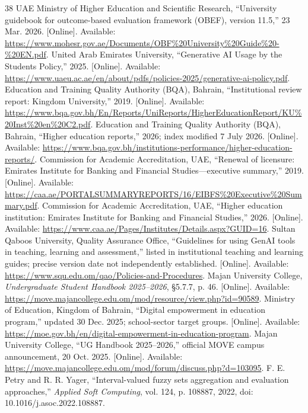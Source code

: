 \documentclass[conference,letterpaper]{IEEEtran}
\begin{document}
\begin{thebibliography}{38}
 UAE Ministry of Higher Education and Scientific Research, ``University guidebook for outcome-based evaluation framework (OBEF), version 11.5,'' 23 Mar. 2026. [Online]. Available: \url{https://www.mohesr.gov.ae/Documents/OBF%20University%20Guide%20-%20EN.pdf}.
 United Arab Emirates University, ``Generative AI Usage by the Students Policy,'' 2025. [Online]. Available: \url{https://www.uaeu.ac.ae/en/about/pdfs/policies-2025/generative-ai-policy.pdf}.
 Education and Training Quality Authority (BQA), Bahrain, ``Institutional review report: Kingdom University,'' 2019. [Online]. Available: \url{https://www.bqa.gov.bh/En/Reports/UniReports/HigherEducationReport/KU%20Inst%20en%20C2.pdf}.
 Education and Training Quality Authority (BQA), Bahrain, ``Higher education reports,'' 2026; index modified 7 July 2026. [Online]. Available: \url{https://www.bqa.gov.bh/institutions-performance/higher-education-reports/}.
 Commission for Academic Accreditation, UAE, ``Renewal of licensure: Emirates Institute for Banking and Financial Studies---executive summary,'' 2019. [Online]. Available: \url{https://caa.ae/PORTALSUMMARYREPORTS/16/EIBFS%20Executive%20Summary.pdf}.
 Commission for Academic Accreditation, UAE, ``Higher education institution: Emirates Institute for Banking and Financial Studies,'' 2026. [Online]. Available: \url{https://www.caa.ae/Pages/Institutes/Details.aspx?GUID=16}.
 Sultan Qaboos University, Quality Assurance Office, ``Guidelines for using GenAI tools in teaching, learning and assessment,'' listed in institutional teaching and learning guides; precise version date not independently established. [Online]. Available: \url{https://www.squ.edu.om/qao/Policies-and-Procedures}.
 Majan University College, \emph{Undergraduate Student Handbook 2025--2026}, \S5.7.7, p. 46. [Online]. Available: \url{https://move.majancollege.edu.om/mod/resource/view.php?id=90589}.
 Ministry of Education, Kingdom of Bahrain, ``Digital empowerment in education program,'' updated 30 Dec. 2025; school-sector target groups. [Online]. Available: \url{https://moe.gov.bh/en/digital-empowerment-in-education-program}.
 Majan University College, ``UG Handbook 2025--2026,'' official MOVE campus announcement, 20 Oct. 2025. [Online]. Available: \url{https://move.majancollege.edu.om/mod/forum/discuss.php?d=103095}.
 F. E. Petry and R. R. Yager, ``Interval-valued fuzzy sets aggregation and evaluation approaches,'' \emph{Applied Soft Computing}, vol. 124, p. 108887, 2022, doi: 10.1016/j.asoc.2022.108887.

\end{thebibliography}
\end{document}
